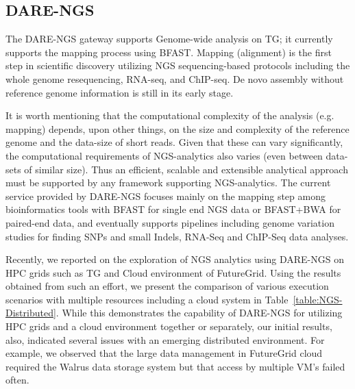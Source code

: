 \documentclass{sig-alternate}
\begin{document}
\subsection{DARE-NGS}
The DARE-NGS gateway %
supports Genome-wide analysis on TG; it currently supports the mapping
process using BFAST. Mapping (alignment) is the first
step in scientific discovery utilizing NGS sequencing-based protocols
including the whole genome resequencing, RNA-seq, and ChIP-seq.  De
novo assembly without reference genome information is still in its
early stage.

It is worth mentioning that the computational complexity of the
analysis (e.g. mapping) depends, upon other things, on the size and
complexity of the reference genome and the data-size of short reads.
Given that these can vary significantly, the computational
requirements of NGS-analytics also varies (even between data-sets of
similar size).  Thus an efficient, scalable and extensible analytical
approach must be supported by any framework supporting NGS-analytics.
The current service provided by DARE-NGS focuses mainly on the mapping
step among bioinformatics tools with BFAST for single end NGS data or
BFAST+BWA for paired-end data, and eventually supports pipelines
including genome variation studies for finding SNPs and small Indels,
RNA-Seq and ChIP-Seq data analyses.


Recently, we reported on the exploration of NGS analytics using DARE-NGS
on HPC grids such as TG and Cloud environment of
FutureGrid\cite{ecmls11}.  Using the results obtained from such an
effort, we present the comparison of various execution scenarios with
multiple resources including a cloud system in
Table~\ref{table:NGS-Distributed}.  While this demonstrates the
capability of DARE-NGS for utilizing HPC grids and a cloud environment
together or separately, our initial results, also, indicated several
issues with an emerging distributed environment.  For example, we
observed that the large data management in FutureGrid cloud required
the Walrus data storage system but that access by multiple VM's
failed often.  
\end{document}
